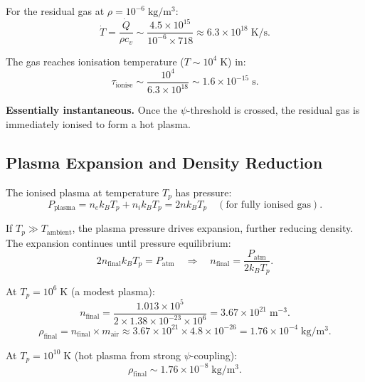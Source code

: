 \documentclass[11pt,a4paper]{article}
\begin{document}
For the residual gas at $\rho = 10^{-6}\;\mathrm{kg/m^3}$:
\begin{equation}
\dot{T} = \frac{\dot{Q}}{\rho c_v} \sim \frac{4.5 \times 10^{15}}{10^{-6} \times 718}
\approx 6.3 \times 10^{18}\;\mathrm{K/s}.
\end{equation}

The gas reaches ionisation temperature ($T \sim 10^4\;\mathrm{K}$) in:
\begin{equation}
\tau_{\mathrm{ionise}} \sim \frac{10^4}{6.3 \times 10^{18}} \sim 1.6 \times 10^{-15}\;\mathrm{s}.
\end{equation}

\textbf{Essentially instantaneous.} Once the $\psi$-threshold is crossed, the
residual gas is immediately ionised to form a hot plasma.

\subsection{Plasma Expansion and Density Reduction}

The ionised plasma at temperature $T_p$ has pressure:
\begin{equation}
P_{\mathrm{plasma}} = n_e k_B T_p + n_i k_B T_p = 2n k_B T_p
\quad (\text{for fully ionised gas}).
\end{equation}

If $T_p \gg T_{\mathrm{ambient}}$, the plasma pressure drives expansion,
further reducing density. The expansion continues until pressure equilibrium:
\begin{equation}
2n_{\mathrm{final}} k_B T_p = P_{\mathrm{atm}}
\quad\Longrightarrow\quad
n_{\mathrm{final}} = \frac{P_{\mathrm{atm}}}{2 k_B T_p}.
\end{equation}

At $T_p = 10^6\;\mathrm{K}$ (a modest plasma):
\begin{equation}
n_{\mathrm{final}} = \frac{1.013 \times 10^5}{2 \times 1.38 \times 10^{-23} \times 10^6}
= 3.67 \times 10^{21}\;\mathrm{m^{-3}}.
\end{equation}
\begin{equation}
\rho_{\mathrm{final}} = n_{\mathrm{final}} \times m_{\mathrm{air}}
\approx 3.67 \times 10^{21} \times 4.8 \times 10^{-26}
= 1.76 \times 10^{-4}\;\mathrm{kg/m^3}.
\end{equation}

At $T_p = 10^{10}\;\mathrm{K}$ (hot plasma from strong $\psi$-coupling):
\begin{equation}
\rho_{\mathrm{final}} \sim 1.76 \times 10^{-8}\;\mathrm{kg/m^3}.
\end{equation}
\end{document}
